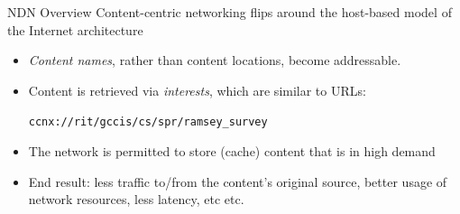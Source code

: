 \documentclass[handout]{beamer}
\begin{document}
\begin{frame}{NDN Overview}
	Content-centric networking flips around the host-based model of the Internet architecture
	\begin{itemize}
		\item \emph{Content names}, rather than content locations, become addressable. 
		\item Content is retrieved via \emph{interests}, which are similar to URLs: 
		\begin{center}
			{\tt ccnx://rit/gccis/cs/spr/ramsey\_survey}
		\end{center}
		\item The network is permitted to store (cache) content that is in high demand
		\item End result: less traffic to/from the content's original source, better usage of network resources, less latency, etc etc.
	\end{itemize}
\end{frame}

\end{document}
